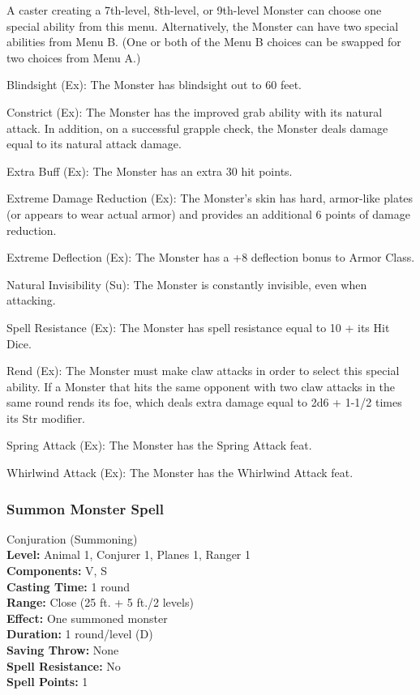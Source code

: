 A caster creating a 7th-level, 8th-level, or 9th-level Monster 
can choose one special ability from this menu. 
Alternatively, the Monster can have two special abilities from Menu B. 
(One or both of the Menu B choices can be swapped for two choices from Menu A.)
\begin{list}{}{\leftmargin=1em}
\item Blindsight (Ex): The Monster has blindsight out to 60 feet.
\item Constrict (Ex): The Monster has the improved grab ability with its natural attack. 
In addition, on a successful grapple check, the Monster deals damage equal to its natural attack damage.
\item Extra Buff (Ex): The Monster has an extra 30 hit points.
\item Extreme Damage Reduction (Ex): The Monster's skin has hard, 
armor-like plates (or appears to wear actual armor) and provides an additional 6 points of damage reduction.
\item Extreme Deflection (Ex): The Monster has a +8 deflection bonus to Armor Class.
\item Natural Invisibility (Su): The Monster is constantly invisible, even when attacking. 
\item Spell Resistance (Ex): The Monster has spell resistance equal to 10 + its Hit Dice.
\item Rend (Ex): The Monster must make claw attacks in order to select this special ability.
If a Monster that hits the same opponent with two claw attacks in the same round rends its foe, 
which deals extra damage equal to 2d6 + 1-1/2 times its Str modifier.
\item Spring Attack (Ex): The Monster has the Spring Attack feat.
\item Whirlwind Attack (Ex): The Monster has the Whirlwind Attack feat.
\end{list}
\subsubsection[Summon Monster]{Summon Monster Spell}
\label{Spell:SummonMonster}
Conjuration (Summoning)
\\ \textbf{Level:} Animal 1, Conjurer 1, Planes 1, Ranger 1
\\ \textbf{Components:} V, S
\\ \textbf{Casting Time:} 1 round
\\ \textbf{Range:} Close (25 ft. + 5 ft./2 levels)
\\ \textbf{Effect:} One summoned monster
\\ \textbf{Duration:} 1 round/level (D)
\\ \textbf{Saving Throw:} None
\\ \textbf{Spell Resistance:} No
\\ \textbf{Spell Points:} 1

